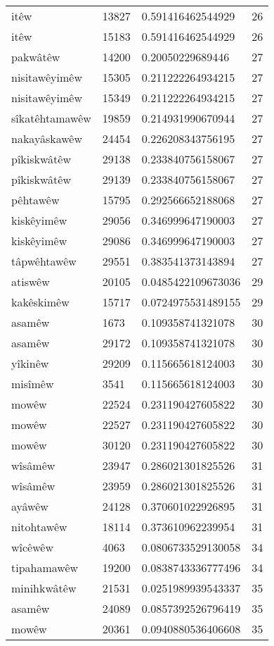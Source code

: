 \begin{longtable}{llll}
itêw & 13827 & 0.591416462544929 & 26\\
itêw & 15183 & 0.591416462544929 & 26\\
pakwâtêw & 14200 & 0.20050229689446 & 27\\
nisitawêyimêw & 15305 & 0.211222264934215 & 27\\
nisitawêyimêw & 15349 & 0.211222264934215 & 27\\
sîkatêhtamawêw & 19859 & 0.214931990670944 & 27\\
nakayâskawêw & 24454 & 0.226208343756195 & 27\\
pîkiskwâtêw & 29138 & 0.233840756158067 & 27\\
pîkiskwâtêw & 29139 & 0.233840756158067 & 27\\
pêhtawêw & 15795 & 0.292566652188068 & 27\\
kiskêyimêw & 29056 & 0.346999647190003 & 27\\
kiskêyimêw & 29086 & 0.346999647190003 & 27\\
tâpwêhtawêw & 29551 & 0.383541373143894 & 27\\
atiswêw & 20105 & 0.0485422109673036 & 29\\
kakêskimêw & 15717 & 0.0724975531489155 & 29\\
asamêw & 1673 & 0.109358741321078 & 30\\
asamêw & 29172 & 0.109358741321078 & 30\\
yîkinêw & 29209 & 0.115665618124003 & 30\\
misîmêw & 3541 & 0.115665618124003 & 30\\
mowêw & 22524 & 0.231190427605822 & 30\\
mowêw & 22527 & 0.231190427605822 & 30\\
mowêw & 30120 & 0.231190427605822 & 30\\
wîsâmêw & 23947 & 0.286021301825526 & 31\\
wîsâmêw & 23959 & 0.286021301825526 & 31\\
ayâwêw & 24128 & 0.370601022926895 & 31\\
nitohtawêw & 18114 & 0.373610962239954 & 31\\
wîcêwêw & 4063 & 0.0806733529130058 & 34\\
tipahamawêw & 19200 & 0.0838743336777496 & 34\\
minihkwâtêw & 21531 & 0.0251989939543337 & 35\\
asamêw & 24089 & 0.0857392526796419 & 35\\
mowêw & 20361 & 0.0940880536406608 & 35\\

\end{longtable}
